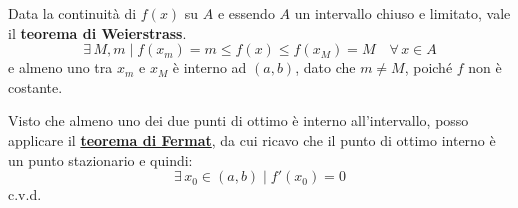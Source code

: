\documentclass[../../dimostrazioni]{subfiles}
\begin{document}
                Data la continuità di \(f(x)\) su \(A\) e essendo \(A\) un intervallo chiuso e limitato, vale il \textbf{teorema di Weierstrass}.
                \[ \exists \, M, m \; | \; f(x_m)=m \leqslant f(x) \leqslant f(x_M) = M \quad \forall \, x \in A \]
                e almeno uno tra \(x_m\) e \(x_M\) è interno ad \( (a,b) \), dato che \( m \neq M \), poiché \( f \) non è costante.
                
                Visto che almeno uno dei due punti di ottimo è interno all'intervallo, posso applicare il \textbf{\hyperref[teoFermat]{teorema di Fermat}}, da cui ricavo che il punto di ottimo interno è un punto stazionario e quindi:
                \[\exists \, x_0 \in (a,b) \; | \; f'(x_0) = 0 \]
                c.v.d.

    
\end{document}
